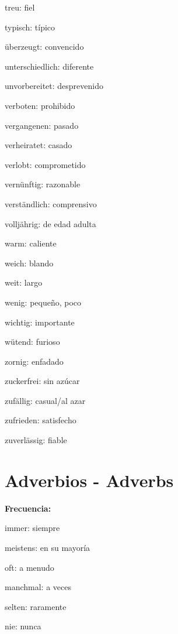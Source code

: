 \begin{multicols}{2}
\begin{myitemize}
\item treu: fiel
\item typisch: típico
\item überzeugt: convencido
\item unterschiedlich: diferente
\item unvorbereitet: desprevenido
\item verboten: prohibido
\item vergangenen: pasado
\item verheiratet: casado
\item verlobt: comprometido
\item vernünftig: razonable
\item verständlich: comprensivo
\item volljährig: de edad adulta
\item warm: caliente
\item weich: blando
\item weit: largo
\item wenig: pequeño, poco
\item wichtig: importante
\item wütend: furioso
\item zornig: enfadado
\item zuckerfrei: sin azúcar
\item zufällig: casual/al azar
\item zufrieden: satisfecho
\item zuverlässig: fiable
\end{myitemize}
\end{multicols}

\section{Adverbios - Adverbs}
\textbf{Frecuencia:}
\begin{myitemize}
\item immer: siempre
\item meistens: en su mayoría
\item oft: a menudo
\item manchmal: a veces
\item selten: raramente
\item nie: nunca
\end{myitemize}

